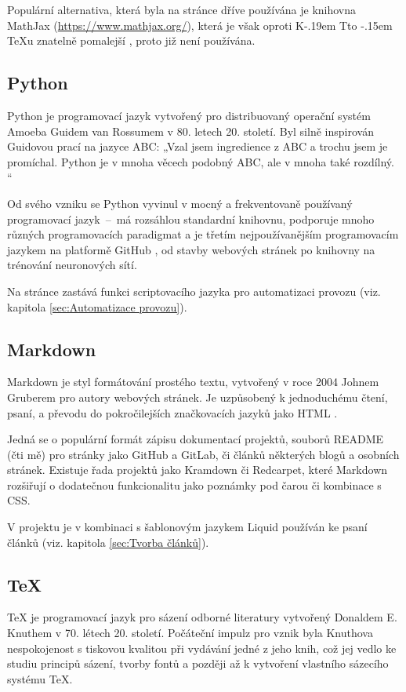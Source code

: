 \documentclass[a4paper, 12pt]{article}
\makeatletter
\DeclareRobustCommand{\KaTeX}{%
  K\kern -.19em
  {\sbox \z@ T\vbox to\ht \z@ {\hbox{%
  \check@mathfonts
  \fontsize\sf@size\z@
  \selectfont A}%
  \vss}%
}\kern -.15em
\TeX}
\makeatother
\begin{document}
  Populární alternativa, která byla na stránce dříve používána je knihovna MathJax (\url{https://www.mathjax.org/}), která je však oproti \KaTeX u znatelně pomalejší \cite{katex-mathjax-comparison}, proto již není používána.


  \subsection{Python} \label{sec:Python}
  Python je programovací jazyk vytvořený pro distribuovaný operační systém Amoeba Guidem van Rossumem v 80. letech 20. století. Byl silně inspirován Guidovou prací na jazyce ABC: „Vzal jsem ingredience z ABC a trochu jsem je promíchal. Python je v mnoha věcech podobný ABC, ale v mnoha také rozdílný. \cite{making-of-python}“

  Od svého vzniku se Python vyvinul v mocný a frekventovaně používaný programovací jazyk~--~má rozsáhlou standardní knihovnu, podporuje mnoho různých programovacích paradigmat a je třetím nejpoužívanějším programovacím jazykem na platformě GitHub \cite{github-statistics}, od stavby webových stránek po knihovny na trénování neuronových sítí.

  Na stránce zastává funkci scriptovacího jazyka pro automatizaci provozu (viz. kapitola \ref{sec:Automatizace provozu}).


  \subsection{Markdown} \label{sec:Markdown}
  Markdown je styl formátování prostého textu, vytvořený v roce 2004 Johnem Gruberem pro autory webových stránek. Je uzpůsobený k jednoduchému čtení, psaní, a převodu do pokročilejších značkovacích jazyků jako HTML \cite{markdown-history}.

  Jedná se o populární formát zápisu dokumentací projektů, souborů README (čti mě) pro stránky jako GitHub a GitLab, či článků některých blogů a osobních stránek. Existuje řada projektů jako Kramdown či Redcarpet, které Markdown rozšiřují o dodatečnou funkcionalitu jako poznámky pod čarou či kombinace s CSS.

  V projektu je v kombinaci s šablonovým jazykem Liquid používán ke psaní článků (viz. kapitola \ref{sec:Tvorba článků}).


  \subsection{\TeX} \label{sec:TeX}
  \TeX{} je programovací jazyk pro sázení odborné literatury vytvořený Donaldem E. Knuthem v 70. létech 20. století. Počáteční impulz pro vznik byla Knuthova nespokojenost s tiskovou kvalitou při vydávání jedné z jeho knih, což jej vedlo ke studiu principů sázení, tvorby fontů a později až k vytvoření vlastního sázecího systému \TeX \cite{tex-history}.
\end{document}
